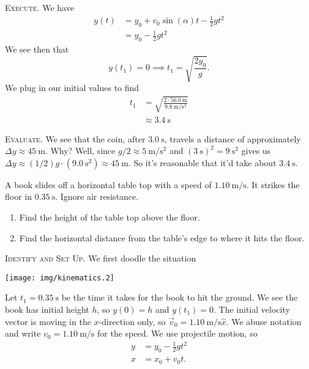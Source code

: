 \textsc{Execute.}
We have
\begin{equation}
\begin{split}
y(t) &= y_{0} + v_{0}\sin(\alpha)t - \frac{1}{2}gt^{2}\\
&=y_{0} - \frac{1}{2}gt^{2}
\end{split}
\end{equation}
We see then that
\begin{equation}
y(t_{1}) = 0\implies t_{1}=\sqrt{\frac{2y_{0}}{g}}.
\end{equation}
We plug in our initial values to find
\begin{equation}
\begin{split}
t_{1} &= \sqrt{\frac{2\cdot\SI{56.0}{\meter}}{\SI{9.8}{\meter\per\second\squared}}}\\
&\approx \SI{3.4}{\second}
\end{split}
\end{equation}

\textsc{Evaluate.}
We see that the coin, after $\SI{3.0}{\second}$, travels a distance
of approximately $\Delta y\approx \SI{45}{\meter}$. Why? Well,
since $g/2\approx \SI{5}{\meter/\second\squared}$ and 
$(\SI{3}{\second})^{2}=\SI{9}{\second\squared}$ gives us $\Delta y\approx(1/2)g\cdot(\SI{9.0}{\second\squared})\approx \SI{45}{\meter}$. So it's
reasonable that it'd take about $\SI{3.4}{\second}$.

\makeatletter
{}
\makeatother
A book slides off a horizontal table top with a speed of
$\SI{1.10}{\meter/\second}$. It strikes the floor in
$\SI{0.35}{\second}$. Ignore air resistance.
\begin{enumerate}
\item Find the height of the table top above the floor.
\item Find the horizontal distance from the table's edge to where it
  hits the floor.
\end{enumerate}

\textsc{Identify and Set Up.}
We first doodle the situation
\begin{center}
\texttt{[image: img/kinematics.2]}
\end{center}
Let $t_{1}=\SI{0.35}{\second}$ be the time it takes for the book to hit
the ground. We see the book has initial height $h$, so $y(0)=h$ and
$y(t_{1})=0$. The initial velocity vector is moving in the $x$-direction
only, so $\vec{v}_{0}=\SI{1.10}{\meter\per\second}\hat{x}$. We abuse
notation and write $v_{0}=\SI{1.10}{\meter\per\second}$ for the speed. We use
projectile motion, so
\begin{equation*}
\begin{split}
y &= y_{0} - \frac{1}{2}gt^{2}\\
x &= x_{0} + v_{0}t.
\end{split}
\end{equation*}


